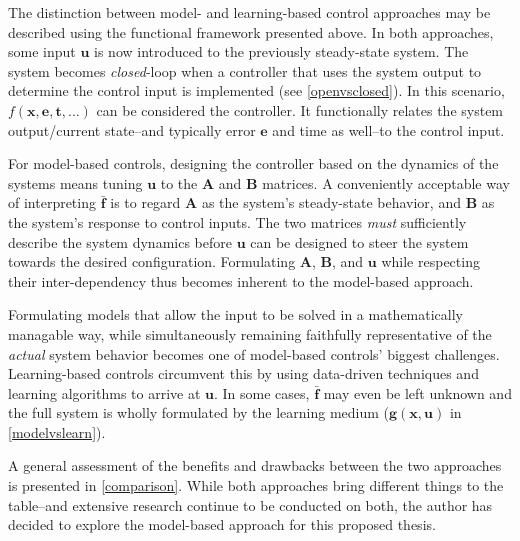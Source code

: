 

The distinction between model- and learning-based control approaches may be described using the functional framework presented above. In both approaches, some input $\mathbf{u}$ is now introduced to the previously steady-state system. The system becomes \textit{closed}-loop when a controller that uses the system output to determine the control input is implemented (see \autoref{openvsclosed}). %
In this scenario, $f(\mathbf{x,e,t,...})$ can be considered the controller. It functionally relates the system output/current state--and typically error $\mathbf{e}$ and time as well--to the control input. 



For model-based controls, designing the controller based on the dynamics of the systems means tuning $\mathbf{u}$ to the $\mathbf{A}$ and $\mathbf{B}$ matrices. A conveniently acceptable way of interpreting $\mathbf{\bar{f}}$ is to regard $\mathbf{A}$ as the system's steady-state behavior, and $\mathbf{B}$ as the system's response to control inputs. The two matrices \textit{must} sufficiently describe the system dynamics before $\mathbf{u}$ can be designed to steer the system towards the desired configuration. Formulating $\mathbf{A}$, $\mathbf{B}$, and $\mathbf{u}$ while respecting their inter-dependency thus becomes inherent to the model-based approach.
  
Formulating models that allow the input to be solved in a mathematically managable way, while simultaneously remaining faithfully representative of the \textit{actual} system behavior becomes one of model-based controls' biggest challenges. Learning-based controls circumvent this by using data-driven techniques and learning algorithms to arrive at $\mathbf{u}$. In some cases, $\mathbf{\bar{f}}$ may even be left unknown and the full system is wholly formulated by the learning medium ($\mathbf{g(x,u)}$ in \autoref{modelvslearn}).



A general assessment of the benefits and drawbacks between the two approaches is presented in \autoref{comparison}. While both approaches bring different things to the table--and extensive research continue to be conducted on both, the author has decided to explore the model-based approach for this proposed thesis.

